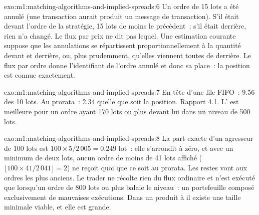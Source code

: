 \begin{solution}{exo:m1:matching-algorithms-and-implied-spreads:6}
Un ordre de 15 lots a été annulé (une transaction aurait produit un
message de transaction). S'il était devant l'ordre de la stratégie, 15 lots de moins le précèdent~; s'il était derrière,
rien n'a changé. Le flux par prix ne dit pas lequel. Une estimation courante
suppose que les annulations se répartissent proportionnellement à la quantité
devant et derrière, ou, plus prudemment, qu'elles viennent toutes de derrière. Le flux par
ordre donne l'identifiant de l'ordre annulé et donc sa place~: la
position est connue exactement.
\end{solution}

\begin{solution}{exo:m1:matching-algorithms-and-implied-spreads:7}
En tête d'une file FIFO~: 9.56 des 10 lots. Au prorata~: 2.34 quelle que soit
la position. Rapport 4.1. L' est meilleure pour un ordre ayant 170 lots ou plus
devant lui dans un niveau de 500 lots.
\end{solution}

\begin{solution}{exo:m1:matching-algorithms-and-implied-spreads:8}
La part exacte d'un agresseur de 100 lots est $100 \times 5/2\,005 = 0.249$ lot~: elle
s'arrondit à zéro, et avec un minimum de deux lots, aucun ordre de moins de 41
lots affiché ($\lfloor 100 \times 41/2\,041\rfloor = 2$) ne reçoit quoi que ce soit
au prorata. Les restes vont aux ordres les plus anciens. Le trader ne récolte rien
du flux ordinaire et n'est exécuté que lorsqu'un ordre de 800 lots ou plus
balaie le niveau~: un portefeuille composé exclusivement de mauvaises exécutions. Dans un produit à 
il existe une taille minimale viable, et elle est grande.
\end{solution}

